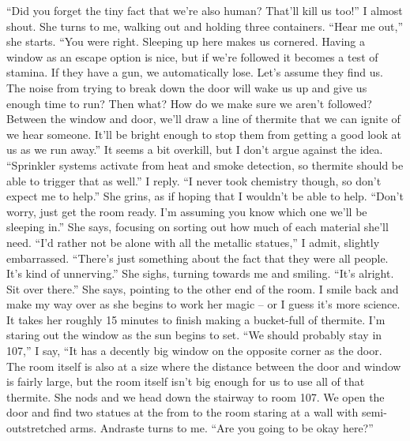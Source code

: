 \documentclass[a4paper, 12pt]{book}
\newcommand\tab[1][1cm]{\hspace*{#1}}
\begin{document}
\newline
\tab
“Did you forget the tiny fact that we’re also human? That’ll kill us too!” I almost shout. 
\newline
\tab
She turns to me, walking out and holding three containers. “Hear me out,” she starts. “You were right. Sleeping up here makes us cornered. Having a window as an escape option is nice, but if we’re followed it becomes a test of stamina. If they have a gun, we automatically lose. Let’s assume they find us. The noise from trying to break down the door will wake us up and give us enough time to run? Then what? How do we make sure we aren’t followed? Between the window and door, we’ll draw a line of thermite that we can ignite of we hear someone. It’ll be bright enough to stop them from getting a good look at us as we run away.” It seems a bit overkill, but I don’t argue against the idea.
\newline
\tab
“Sprinkler systems activate from heat and smoke detection, so thermite should be able to trigger that as well.” I reply. “I never took chemistry though, so don’t expect me to help.”
\newline
\tab
She grins, as if hoping that I wouldn’t be able to help. “Don’t worry, just get the room ready. I’m assuming you know which one we’ll be sleeping in.” She says, focusing on sorting out how much of each material she’ll need.
\newline
\tab
“I’d rather not be alone with all the metallic statues,” I admit, slightly embarrassed. “There’s just something about the fact that they were all people. It’s kind of unnerving.”
\newline
\tab
She sighs, turning towards me and smiling. “It’s alright. Sit over there.” She says, pointing to the other end of the room. I smile back and make my way over as she begins to work her magic – or I guess it’s more science. It takes her roughly 15 minutes to finish making a bucket-full of thermite. 
\newline
\tab
I’m staring out the window as the sun begins to set. “We should probably stay in 107,” I say, “It has a decently big window on the opposite corner as the door. The room itself is also at a size where the distance between the door and window is fairly large, but the room itself isn’t big enough for us to use all of that thermite.
\newline
\tab
She nods and we head down the stairway to room 107. We open the door and find two statues at the from to the room staring at a wall with semi-outstretched arms. Andraste turns to me. “Are you going to be okay here?” 
\end{document}
